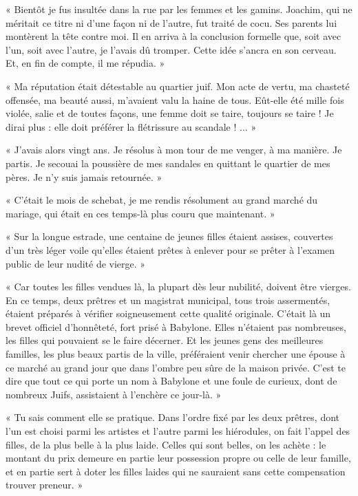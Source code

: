 \documentclass[a4paper, 11pt, oneside, polutonikogreek, french]{article}
\begin{document}
« Bientôt je fus insultée dans la rue par les femmes et les gamins. Joachim, qui ne méritait ce titre ni d'une façon ni de l'autre, fut traité de cocu. Ses parents lui montèrent la tête contre moi. Il en arriva à la conclusion formelle que, soit avec l'un, soit avec l'autre, je l'avais dû tromper. Cette idée s'ancra en son cerveau. Et, en fin de compte, il me répudia. »

« Ma réputation était détestable au quartier juif. Mon acte de vertu, ma chasteté offensée, ma beauté aussi, m'avaient valu la haine de tous. Eût-elle été mille fois violée, salie et de toutes façons, une femme doit se taire, toujours se taire ! Je dirai plus : elle doit préférer la flétrissure au scandale ! ... »

\bigskip
\centerline{\EightStarTaper}
\centerline{\EightStarTaper\EightStarTaper}
\bigskip

« J'avais alors vingt ans. Je résolus à mon tour de me venger, à ma manière. Je partis. Je secouai la poussière de mes sandales en quittant le quartier de mes pères. Je n'y suis jamais retournée. »

« C'était le mois de schebat, je me rendis résolument au grand marché du mariage, qui était en ces temps-là plus couru que maintenant. »

« Sur la longue estrade, une centaine de jeunes filles étaient assises, couvertes d'un très léger voile qu'elles étaient prêtes à enlever pour se prêter à l'examen public de leur nudité de vierge. »

« Car toutes les filles vendues là, la plupart dès leur nubilité, doivent être vierges. En ce temps, deux prêtres et un magistrat municipal, tous trois assermentés, étaient préparés à vérifier soigneusement cette qualité originale. C'était là un brevet officiel d'honnêteté, fort prisé à Babylone. Elles n'étaient pas nombreuses, les filles qui pouvaient se le faire décerner. Et les jeunes gens des meilleures familles, les plus beaux partis de la ville, préféraient venir chercher une épouse à ce marché au grand jour que dans l'ombre peu sûre de la maison privée. C'est te dire que tout ce qui porte un nom à Babylone et une foule de curieux, dont de nombreux Juifs, assistaient à l'enchère ce jour-là. »

« Tu sais comment elle se pratique. Dans l'ordre fixé par les deux prêtres, dont l'un est choisi parmi les artistes et l'autre parmi les hiérodules, on fait l'appel des filles, de la plus belle à la plus laide. Celles qui sont belles, on les achète : le montant du prix demeure en partie leur possession propre ou celle de leur famille, et en partie sert à doter les filles laides qui ne sauraient sans cette compensation trouver preneur. »
\end{document}
